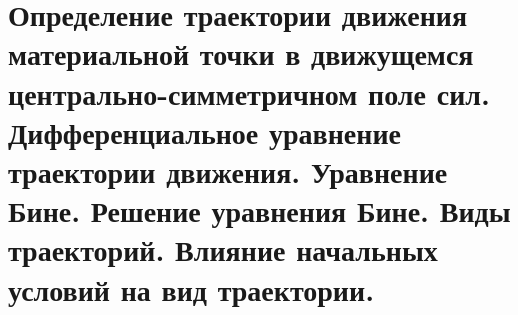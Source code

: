 \chapter{Определение траектории движения материальной точки в движущемся
центрально-симметричном поле сил. Дифференциальное уравнение траектории
движения. Уравнение Бине. Решение уравнения Бине. Виды траекторий. Влияние
начальных условий на вид траектории.}

\newpage
